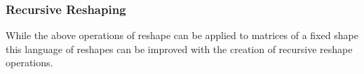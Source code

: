 \begin{code}%
\>[2][@{}l@{\AgdaIndent{1}}]%
\>[4]\AgdaSpace{}%
\AgdaSymbol{:}\<%
\\
\>[4][@{}l@{\AgdaIndent{0}}]%
\>[6]%
\>[921I]\AgdaSymbol{(}\AgdaSpace{}%
\AgdaSymbol{:}\AgdaSpace{}%
\AgdaSpace{}%
\AgdaSpace{}%
\AgdaSymbol{)}\<%
\\
\>[.][@{}l@{}]\<[921I]%
\>[8]\AgdaSymbol{(}\AgdaSpace{}%
\AgdaSymbol{:}\AgdaSpace{}%
\AgdaSpace{}%
\AgdaSpace{}%
\AgdaSymbol{)}\<%
\\
%
\>[6]\AgdaComment{---------------------}\<%
\\
%
\>[6]\AgdaSpace{}%
\AgdaSpace{}%
\AgdaSpace{}%
\AgdaSpace{}%
\AgdaSpace{}%
\AgdaSpace{}%
\AgdaSpace{}%
\AgdaSpace{}%
\AgdaSpace{}%
\<%
\\
%
\\[\AgdaEmptyExtraSkip]%
%
\>[4]\AgdaSpace{}%
\AgdaSymbol{:}\<%
\\
\>[4][@{}l@{\AgdaIndent{0}}]%
\>[6]%
\>[940I]\AgdaSymbol{(}\AgdaSpace{}%
\AgdaSymbol{:}\AgdaSpace{}%
\AgdaSpace{}%
\AgdaSpace{}%
\AgdaSymbol{)}\<%
\\
\>[.][@{}l@{}]\<[940I]%
\>[8]\AgdaSymbol{(}\AgdaSpace{}%
\AgdaSymbol{:}\AgdaSpace{}%
\AgdaSpace{}%
\AgdaSpace{}%
\AgdaSymbol{)}\<%
\\
%
\>[6]\AgdaComment{-----------------------------}\<%
\\
%
\>[6]\AgdaSpace{}%
\AgdaSpace{}%
\AgdaSpace{}%
\AgdaSpace{}%
\AgdaSymbol{(}\AgdaSpace{}%
\AgdaSymbol{)}\AgdaSpace{}%
\AgdaSpace{}%
\AgdaSpace{}%
\AgdaSpace{}%
\AgdaSpace{}%
\AgdaSpace{}%
\<%
\end{code}

\subsubsection{Recursive Reshaping}
While the above operations of reshape can be applied to matrices of a fixed shape
this language of reshapes can be improved with the creation of recursive reshape
operations.

